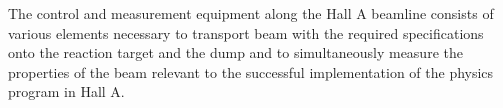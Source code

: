 
The control and measurement equipment along the Hall A beamline consists of 
various elements necessary to transport beam with the required specifications 
onto the reaction target and the dump and to simultaneously measure the 
properties of the beam relevant to the successful implementation of the 
physics program in Hall A.  


